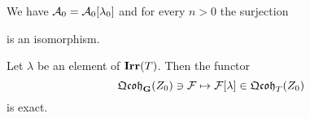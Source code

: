 \begin{lemma}\label{lemma:zero_stabiization}
We have ${\mathcal A}_0 = {\mathcal A}_0[\lambda_0]$ and for every $n > 0$ the surjection
\begin{center}
\end{center}
is an isomorphism.
\end{lemma}

\begin{lemma}\label{lemma:isotypic_components_of_central_torus}
Let $\lambda$ be an element of $\mathbf{Irr}(T)$. Then the functor
$$\mathfrak{Qcoh}_{\mathbf{G}}(Z_0) \ni {\mathcal F} \mapsto {\mathcal F}[\lambda]\in \mathfrak{Qcoh}_{T}(Z_0)$$
is exact.
\end{lemma}












\small




